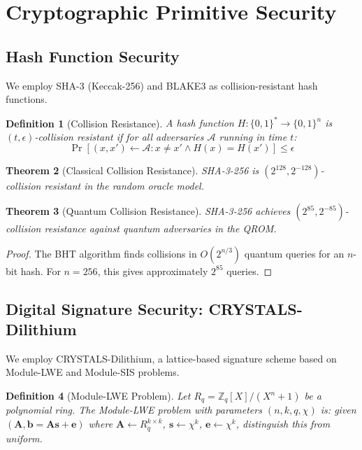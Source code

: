 \documentclass[11pt,a4paper]{article}
\newtheorem{theorem}{Theorem}[section]
\newtheorem{definition}[theorem]{Definition}
\begin{document}
\section{Cryptographic Primitive Security}

\subsection{Hash Function Security}

We employ SHA-3 (Keccak-256) and BLAKE3 as collision-resistant hash functions.

\begin{definition}[Collision Resistance]
A hash function $H : \{0,1\}^* \to \{0,1\}^n$ is $(t, \epsilon)$-collision resistant if for all adversaries $\mathcal{A}$ running in time $t$:
\[
\Pr[(x, x') \leftarrow \mathcal{A} : x \neq x' \land H(x) = H(x')] \leq \epsilon
\]
\end{definition}

\begin{theorem}[Classical Collision Resistance]
SHA-3-256 is $(2^{128}, 2^{-128})$-collision resistant in the random oracle model.
\end{theorem}

\begin{theorem}[Quantum Collision Resistance]
SHA-3-256 achieves $(2^{85}, 2^{-85})$-collision resistance against quantum adversaries in the QROM.
\end{theorem}

\begin{proof}
The BHT algorithm finds collisions in $O(2^{n/3})$ quantum queries for an $n$-bit hash. For $n = 256$, this gives approximately $2^{85}$ queries.
\end{proof}

\subsection{Digital Signature Security: CRYSTALS-Dilithium}

We employ CRYSTALS-Dilithium, a lattice-based signature scheme based on Module-LWE and Module-SIS problems.

\begin{definition}[Module-LWE Problem]
Let $R_q = \mathbb{Z}_q[X]/(X^n + 1)$ be a polynomial ring. The Module-LWE problem with parameters $(n, k, q, \chi)$ is: given $(\mathbf{A}, \mathbf{b} = \mathbf{A}\mathbf{s} + \mathbf{e})$ where $\mathbf{A} \leftarrow R_q^{k \times k}$, $\mathbf{s} \leftarrow \chi^k$, $\mathbf{e} \leftarrow \chi^k$, distinguish this from uniform.
\end{definition}
\end{document}
